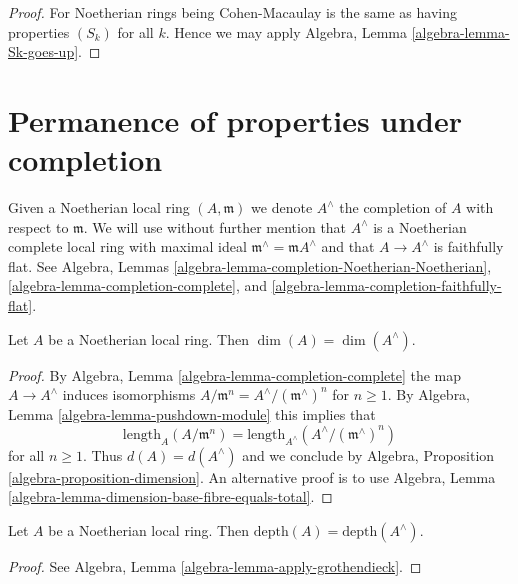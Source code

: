 \begin{proof}
For Noetherian rings being Cohen-Macaulay is the same as having properties
$(S_k)$ for all $k$. Hence we may apply
Algebra, Lemma \ref{algebra-lemma-Sk-goes-up}.
\end{proof}




\section{Permanence of properties under completion}
\label{section-permanence-completion}

\noindent
Given a Noetherian local ring $(A, \mathfrak m)$ we denote $A^\wedge$
the completion of $A$ with respect to $\mathfrak m$. We will use
without further mention that $A^\wedge$ is a Noetherian complete local ring
with maximal ideal $\mathfrak m^\wedge = \mathfrak m A^\wedge$
and that $A \to A^\wedge$ is faithfully flat.
See Algebra, Lemmas
\ref{algebra-lemma-completion-Noetherian-Noetherian},
\ref{algebra-lemma-completion-complete}, and
\ref{algebra-lemma-completion-faithfully-flat}.

\begin{lemma}
\label{lemma-completion-dimension}
Let $A$ be a Noetherian local ring.
Then $\dim(A) = \dim(A^\wedge)$.
\end{lemma}

\begin{proof}
By Algebra, Lemma \ref{algebra-lemma-completion-complete} the map
$A \to A^\wedge$ induces isomorphisms
$A/\mathfrak m^n = A^\wedge/(\mathfrak m^\wedge)^n$ for $n \geq 1$.
By Algebra, Lemma \ref{algebra-lemma-pushdown-module} this implies that
$$
\text{length}_A(A/\mathfrak m^n) =
\text{length}_{A^\wedge}(A^\wedge/(\mathfrak m^\wedge)^n)
$$
for all $n \geq 1$. Thus $d(A) = d(A^\wedge)$ and we conclude
by Algebra, Proposition \ref{algebra-proposition-dimension}.
An alternative proof is to use
Algebra, Lemma \ref{algebra-lemma-dimension-base-fibre-equals-total}.
\end{proof}

\begin{lemma}
\label{lemma-completion-depth}
Let $A$ be a Noetherian local ring. Then
$\text{depth}(A) = \text{depth}(A^\wedge)$.
\end{lemma}

\begin{proof}
See Algebra, Lemma \ref{algebra-lemma-apply-grothendieck}.
\end{proof}

